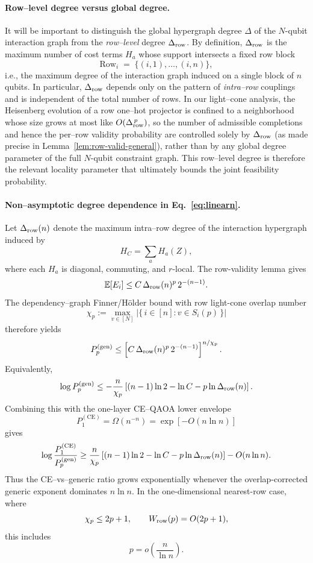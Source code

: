\documentclass[a4paper,onecolumn,11pt,unpublished]{quantumarticle}
\theoremstyle{remark}
\begin{document}
\paragraph{Row–level degree versus global degree.}
It will be important to distinguish the global hypergraph degree $\Delta$ of the
$N$-qubit interaction graph from the \emph{row–level} degree $\Delta_{\rm row}$.
By definition, $\Delta_{\rm row}$ is the maximum number of cost terms $H_a$ whose
support intersects a fixed row block
\[
  \mathrm{Row}_i \;=\; \{(i,1),\dots,(i,n)\},
\]
i.e., the maximum degree of the interaction graph induced on a single block of
$n$ qubits. In particular, $\Delta_{\rm row}$ depends only on the pattern of
\emph{intra–row} couplings and is independent of the total number of rows. In
our light–cone analysis, the Heisenberg evolution of a row one–hot projector is
confined to a neighborhood whose size grows at most like $O(\Delta_{\rm row}^{\,p})$,
so the number of admissible completions and hence the per–row validity
probability are controlled solely by $\Delta_{\rm row}$ (as made precise in
Lemma~\ref{lem:row-valid-general}), rather than by any global degree parameter
of the full $N$-qubit constraint graph. This row–level degree is therefore the
relevant locality parameter that ultimately bounds the joint feasibility
probability.








\paragraph{Non--asymptotic degree dependence in Eq.~\eqref{eq:linearn}.}
Let \(\Delta_{\rm row}(n)\) denote the maximum intra--row degree of the
interaction hypergraph induced by
\[
  H_C=\sum_a H_a(Z),
\]
where each \(H_a\) is diagonal, commuting, and \(r\)-local.  The row-validity
lemma gives
\[
  \mathbb E[E_i]
  \le
  C\,\Delta_{\rm row}(n)^p\,2^{-(n-1)}.
\]
The dependency--graph Finner/Hölder bound with row light-cone overlap number
\[
  \chi_p
  :=
  \max_{v\in[N]}
  \left|\{\,i\in[n]:v\in S_i(p)\,\}\right|
\]
therefore yields
\[
  P_p^{(\mathrm{gen})}
  \le
  \left[
    C\,\Delta_{\rm row}(n)^p\,2^{-(n-1)}
  \right]^{n/\chi_p}.
\]
Equivalently,
\[
  \log P_p^{(\mathrm{gen})}
  \le
  -\frac{n}{\chi_p}
  \left[
    (n-1)\ln 2
    -
    \ln C
    -
    p\ln \Delta_{\rm row}(n)
  \right].
\]
Combining this with the one-layer CE--QAOA lower envelope
\[
  P_1^{(\mathrm{CE})}
  =
  \Omega(n^{-n})
  =
  \exp[-O(n\ln n)]
\]
gives
\[
  \log
  \frac{P_1^{(\mathrm{CE})}}{P_p^{(\mathrm{gen})}}
  \ge
  \frac{n}{\chi_p}
  \left[
    (n-1)\ln 2
    -
    \ln C
    -
    p\ln \Delta_{\rm row}(n)
  \right]
  -
  O(n\ln n).
\]
Thus the CE--vs--generic ratio grows exponentially whenever the
overlap-corrected generic exponent dominates \(n\ln n\).  In the
one-dimensional nearest-row case, where
\[
  \chi_p\le 2p+1,
  \qquad
  W_{\rm row}(p)=O(2p+1),
\]
this includes
\[
  p=o\!\left(\frac{n}{\ln n}\right).
\]
\end{document}
